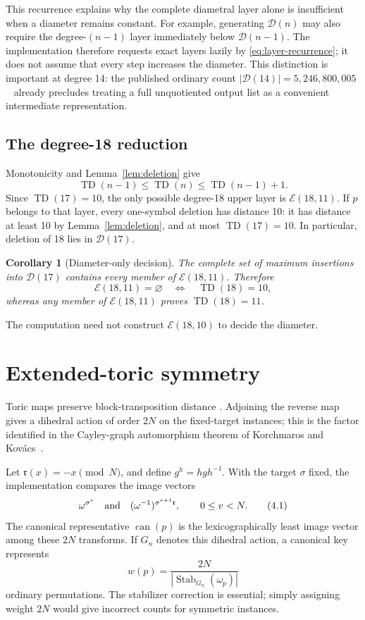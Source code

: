 \documentclass[11pt]{article}
\newtheorem{corollary}[theorem]{Corollary}
\theoremstyle{definition}
\theoremstyle{remark}
\newcommand{\TD}{\operatorname{TD}}
\newcommand{\E}{\mathcal E}
\newcommand{\D}{\mathcal D}
\newcommand{\canon}{\operatorname{can}}
\newcommand{\Stab}{\operatorname{Stab}}
\begin{document}
This recurrence explains why the complete diametral layer alone is
insufficient when a diameter remains constant.  For example, generating
$\D(n)$ may also require the degree-$(n-1)$ layer immediately below
$\D(n-1)$.  The implementation therefore requests exact layers lazily by
\eqref{eq:layer-recurrence}; it does not assume that every step increases the diameter.
This distinction is important at degree 14: the published ordinary count
$|\D(14)|=5{,}246{,}800{,}005$~\cite[Table~5.2]{Korchmaros2015} already
precludes treating a full unquotiented output list as a convenient
intermediate representation.

\subsection{The degree-18 reduction}

Monotonicity and Lemma~\ref{lem:deletion} give
\[
  \TD(n-1)\leq\TD(n)\leq\TD(n-1)+1.
\]
Since $\TD(17)=10$, the only possible degree-18 upper layer is
$\E(18,11)$.  If $p$ belongs to that layer, every one-symbol deletion has
distance 10: it has distance at least 10 by Lemma~\ref{lem:deletion}, and at
most $\TD(17)=10$.  In particular, deletion of 18 lies in $\D(17)$.

\begin{corollary}[Diameter-only decision]
\label{cor:diameter-only}
The complete set of maximum insertions into $\D(17)$ contains every member of
$\E(18,11)$.  Therefore
\[
  \E(18,11)=\varnothing\quad\Longleftrightarrow\quad\TD(18)=10,
\]
whereas any member of $\E(18,11)$ proves $\TD(18)=11$.
\end{corollary}

The computation need not construct $\E(18,10)$ to decide the diameter.

\section{Extended-toric symmetry}
\label{sec:symmetry}

Toric maps preserve block-transposition distance
\cite{ErikssonEtAl2001,Korchmaros2014,Korchmaros2015}.  Adjoining the reverse
map gives a dihedral action of order $2N$ on the fixed-target instances; this
is the factor identified in the Cayley-graph automorphism theorem of
Korchmaros and Kov\'acs~\cite{KorchmarosKovacs2017}.

Let $\mathfrak r(x)=-x\pmod N$, and define $g^h=hgh^{-1}$.  With the target
$\sigma$ fixed, the implementation compares the image vectors
\[
  \omega^{\sigma^v}
  \quad\hbox{and}\quad
  (\omega^{-1})^{\sigma^{v+1}\mathfrak r},
  \qquad 0\leq v<N.                             \tag{4.1}\label{eq:dihedral-action}
\]
The canonical representative $\canon(p)$ is the lexicographically least
image vector among these $2N$ transforms.  If $G_n$ denotes this dihedral
action, a canonical key represents
\[
  w(p)=\frac{2N}{|\Stab_{G_n}(\omega_p)|}        \tag{4.2}\label{eq:orbit-weight}
\]
ordinary permutations.  The stabilizer correction is essential; simply
assigning weight $2N$ would give incorrect counts for symmetric instances.
\end{document}
